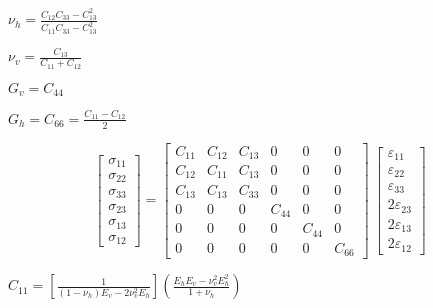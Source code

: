 \documentclass[onecolumn,11pt]{report}
\def\lthtmlcheckvsize{\ifdim\ht\sizebox<\vsize 
  \ifdim\wd\sizebox<\hsize\expandafter\hfill\fi \expandafter\vfill
  \else\expandafter\vss\fi}%
\begin{document}
{\newpage\clearpage
{}%
$\displaystyle \nu_h =  \frac{C_{12}C_{33}-C_{13}^2}{C_{11}C_{33}-C_{13}^2} $%
\lthtmlindisplaymathZ
\lthtmlcheckvsize\clearpage}

{\newpage\clearpage
{}%
$\displaystyle \nu_v = \frac{C_{13}}{C_{11}+C_{12}}  $%
\lthtmlindisplaymathZ
\lthtmlcheckvsize\clearpage}

{\newpage\clearpage
{}%
$\displaystyle G_v = C_{44} $%
\lthtmlindisplaymathZ
\lthtmlcheckvsize\clearpage}

{\newpage\clearpage
{}%
$\displaystyle G_h = C_{66} =  \frac{C_{11}-C_{12}}{2} $%
\lthtmlindisplaymathZ
\lthtmlcheckvsize\clearpage}

{\newpage\clearpage
{}%
\begin{displaymath}%
	\left[
\begin{array} {c}
\sigma_{11} \\
\sigma_{22} \\
\sigma_{33} \\
\sigma_{23} \\
\sigma_{13} \\
\sigma_{12}
\end{array}
\right]
=
\left[
\begin{array}{cccccc}
C_{11} & C_{12} & C_{13} & 0 & 0 & 0\\
C_{12} & C_{11} & C_{13} & 0 & 0 & 0\\
C_{13} & C_{13} & C_{33} & 0 & 0 & 0\\
0 & 0 & 0 & C_{44} & 0 & 0 \\
0 & 0 & 0 & 0 & C_{44} & 0 \\
0 & 0 & 0 & 0 & 0 & C_{66}
\end{array}
\right]
\:
\left[
\begin{array} {c}
\varepsilon_{11} \\
\varepsilon_{22} \\
\varepsilon_{33} \\
2 \varepsilon_{23}  \\
2 \varepsilon_{13}  \\
2 \varepsilon_{12}
\end{array}
\right]\end{displaymath}%
\lthtmldisplayZ
\lthtmlcheckvsize\clearpage}

{\newpage\clearpage
{}%
$\displaystyle C_{11} = \left[ \frac{1}{(1-\nu_h) E_v - 2 \nu_v^2 E_h}  \right] \left( \frac{E_h E_v - \nu_v^2 E_h^2}{1+\nu_h} \right) $%
\lthtmlindisplaymathZ
\lthtmlcheckvsize\clearpage}
\end{document}
